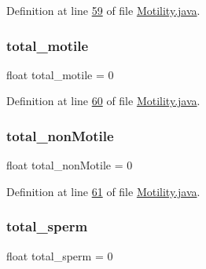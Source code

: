 Definition at line \hyperlink{_motility_8java_source_l00059}{59} of file \hyperlink{_motility_8java_source}{Motility.\+java}.

\hypertarget{classanalysis_1_1_motility_aec24fedb6d4751dbc92852b6b7c467f4}{}\label{classanalysis_1_1_motility_aec24fedb6d4751dbc92852b6b7c467f4} 
\subsubsection{\texorpdfstring{total\+\_\+motile}{total\_motile}}
{\footnotesize\ttfamily float total\+\_\+motile = 0\hspace{0.3cm}{\ttfamily [private]}}



Definition at line \hyperlink{_motility_8java_source_l00060}{60} of file \hyperlink{_motility_8java_source}{Motility.\+java}.

\hypertarget{classanalysis_1_1_motility_a12c018b723047f29c67110a7bb1134a8}{}\label{classanalysis_1_1_motility_a12c018b723047f29c67110a7bb1134a8} 
\subsubsection{\texorpdfstring{total\+\_\+non\+Motile}{total\_nonMotile}}
{\footnotesize\ttfamily float total\+\_\+non\+Motile = 0\hspace{0.3cm}{\ttfamily [private]}}



Definition at line \hyperlink{_motility_8java_source_l00061}{61} of file \hyperlink{_motility_8java_source}{Motility.\+java}.

\hypertarget{classanalysis_1_1_motility_a2815eaed86c0b1e82e0fa050070546de}{}\label{classanalysis_1_1_motility_a2815eaed86c0b1e82e0fa050070546de} 
\subsubsection{\texorpdfstring{total\+\_\+sperm}{total\_sperm}}
{\footnotesize\ttfamily float total\+\_\+sperm = 0\hspace{0.3cm}{\ttfamily [private]}}



